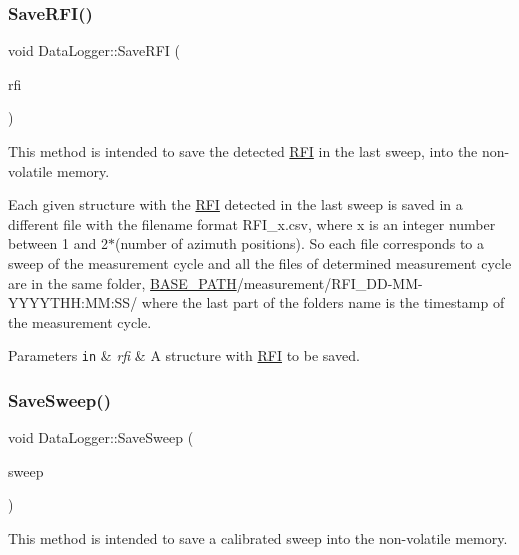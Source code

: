 \subsubsection{\texorpdfstring{Save\+R\+F\+I()}{SaveRFI()}}
{\footnotesize\ttfamily void Data\+Logger\+::\+Save\+R\+FI (\begin{DoxyParamCaption}\item[{const \hyperlink{structRFI}{R\+FI} \&}]{rfi }\end{DoxyParamCaption})}



This method is intended to save the detected \hyperlink{structRFI}{R\+FI} in the last sweep, into the non-\/volatile memory. 

Each given structure with the \hyperlink{structRFI}{R\+FI} detected in the last sweep is saved in a different file with the filename format R\+F\+I\+\_\+x.\+csv, where \textquotesingle{}x\textquotesingle{} is an integer number between 1 and 2$\ast$(number of azimuth positions). So each file corresponds to a sweep of the measurement cycle and all the files of determined measurement cycle are in the same folder, \hyperlink{Basics_8h_a0423f4cb393331ce0b9f6b3a43adcaae}{B\+A\+S\+E\+\_\+\+P\+A\+TH}/measurement/\+R\+F\+I\+\_\+\+D\+D-\/\+M\+M-\/\+Y\+Y\+Y\+Y\+T\+HH\+:MM\+:S\+S/ where the last part of the folder\textquotesingle{}s name is the timestamp of the measurement cycle. 
\begin{DoxyParams}[1]{Parameters}
\mbox{\tt in}  & {\em rfi} & A structure with \hyperlink{structRFI}{R\+FI} to be saved. \\
\hline
\end{DoxyParams}
\mbox{\label{classDataLogger_ab2063fcd87971520a5bfa5aef6d73fea}} 
\subsubsection{\texorpdfstring{Save\+Sweep()}{SaveSweep()}}
{\footnotesize\ttfamily void Data\+Logger\+::\+Save\+Sweep (\begin{DoxyParamCaption}\item[{const \hyperlink{structSweep}{Sweep} \&}]{sweep }\end{DoxyParamCaption})}



This method is intended to save a calibrated sweep into the non-\/volatile memory. 

